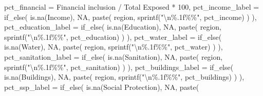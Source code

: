 \documentclass[
  letterpaper,
  DIV=11,
  numbers=noendperiod]{scrartcl}
\newenvironment{Shaded}{}{}
\newcommand{\AttributeTok}[1]{\textcolor[rgb]{0.84,0.23,0.29}{#1}}
\newcommand{\ConstantTok}[1]{\textcolor[rgb]{0.00,0.36,0.77}{#1}}
\newcommand{\DecValTok}[1]{\textcolor[rgb]{0.00,0.36,0.77}{#1}}
\newcommand{\FunctionTok}[1]{\textcolor[rgb]{0.44,0.26,0.76}{#1}}
\newcommand{\NormalTok}[1]{\textcolor[rgb]{0.14,0.16,0.18}{#1}}
\newcommand{\SpecialCharTok}[1]{\textcolor[rgb]{0.00,0.36,0.77}{#1}}
\newcommand{\StringTok}[1]{\textcolor[rgb]{0.01,0.18,0.38}{#1}}
\begin{document}
\begin{Shaded}
\begin{Highlighting}[]
    \AttributeTok{pct\_financial =} \StringTok{\textasciigrave{}}\AttributeTok{Financial inclusion}\StringTok{\textasciigrave{}} \SpecialCharTok{/} \StringTok{\textasciigrave{}}\AttributeTok{Total Exposed}\StringTok{\textasciigrave{}} \SpecialCharTok{*} \DecValTok{100}\NormalTok{,}
    \AttributeTok{pct\_income\_label =} \FunctionTok{if\_else}\NormalTok{(}
      \FunctionTok{is.na}\NormalTok{(Income), }
      \ConstantTok{NA}\NormalTok{, }
      \FunctionTok{paste}\NormalTok{(}
\NormalTok{        region,}
        \FunctionTok{sprintf}\NormalTok{(}\StringTok{"}\SpecialCharTok{\textbackslash{}n}\StringTok{\%.1f\%\%"}\NormalTok{, pct\_income)}
\NormalTok{      ) }
\NormalTok{    ),}
    \AttributeTok{pct\_education\_label =} \FunctionTok{if\_else}\NormalTok{(}
      \FunctionTok{is.na}\NormalTok{(Education), }
      \ConstantTok{NA}\NormalTok{, }
      \FunctionTok{paste}\NormalTok{(}
\NormalTok{        region,}
        \FunctionTok{sprintf}\NormalTok{(}\StringTok{"}\SpecialCharTok{\textbackslash{}n}\StringTok{\%.1f\%\%"}\NormalTok{, pct\_education)}
\NormalTok{      ) }
\NormalTok{    ),}
    \AttributeTok{pct\_water\_label =} \FunctionTok{if\_else}\NormalTok{(}
      \FunctionTok{is.na}\NormalTok{(Water), }
      \ConstantTok{NA}\NormalTok{, }
      \FunctionTok{paste}\NormalTok{(}
\NormalTok{        region,}
        \FunctionTok{sprintf}\NormalTok{(}\StringTok{"}\SpecialCharTok{\textbackslash{}n}\StringTok{\%.1f\%\%"}\NormalTok{, pct\_water)}
\NormalTok{      ) }
\NormalTok{    ),}
    \AttributeTok{pct\_sanitation\_label =} \FunctionTok{if\_else}\NormalTok{(}
      \FunctionTok{is.na}\NormalTok{(Sanitation), }
      \ConstantTok{NA}\NormalTok{, }
      \FunctionTok{paste}\NormalTok{(}
\NormalTok{        region,}
        \FunctionTok{sprintf}\NormalTok{(}\StringTok{"}\SpecialCharTok{\textbackslash{}n}\StringTok{\%.1f\%\%"}\NormalTok{, pct\_sanitation)}
\NormalTok{      ) }
\NormalTok{    ),}
    \AttributeTok{pct\_buildings\_label =} \FunctionTok{if\_else}\NormalTok{(}
      \FunctionTok{is.na}\NormalTok{(Buildings), }
      \ConstantTok{NA}\NormalTok{, }
      \FunctionTok{paste}\NormalTok{(}
\NormalTok{        region,}
        \FunctionTok{sprintf}\NormalTok{(}\StringTok{"}\SpecialCharTok{\textbackslash{}n}\StringTok{\%.1f\%\%"}\NormalTok{, pct\_buildings)}
\NormalTok{      ) }
\NormalTok{    ),}
    \AttributeTok{pct\_ssp\_label =} \FunctionTok{if\_else}\NormalTok{(}
      \FunctionTok{is.na}\NormalTok{(}\StringTok{\textasciigrave{}}\AttributeTok{Social Protection}\StringTok{\textasciigrave{}}\NormalTok{), }
      \ConstantTok{NA}\NormalTok{, }
      \FunctionTok{paste}\NormalTok{(}

\end{Highlighting}
\end{Shaded}
\end{document}
